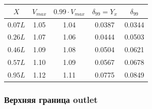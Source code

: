 \documentclass{article}
\newcommand{\n}{\vspace{\baselineskip}}
\newcommand{\ntb}{\tabularnewline}
\begin{document}
\n\n
\noindent
\begin{minipage}{\linewidth}
  \begin{minipage}{0.5\linewidth}
  \end{minipage}
  \hfill
  \begin{minipage}[b]{0.5\linewidth}
  \\ \quad \\
    \begin{tabular}[h!]{c|c|c|cc}
    $X$ & $V_{max}$ & $0.99 \cdot V_{max}$ & $\delta_{99} = Y_{x}$ & $\delta_{99}$ \ntb
    \hline  
    $0.07L$ & 1.05 & 1.04 & 0.0387 & 0.0344 \ntb
    \hline
    $0.26L$ & 1.07 & 1.06 & 0.0444 & 0.0503 \ntb
    \hline
    $0.46L$ & 1.09 & 1.08 & 0.0504 & 0.0621 \ntb
    \hline
    $0.57L$ & 1.10 & 1.09 & 0.0567 & 0.0678 \ntb
    \hline
    $0.95L$ & 1.12 & 1.11 & 0.0775 & 0.0849 \ntb
    \end{tabular}
  \end{minipage}
\end{minipage}

\n\n  
\subsubsection{Верхняя граница outlet}
\end{document}
